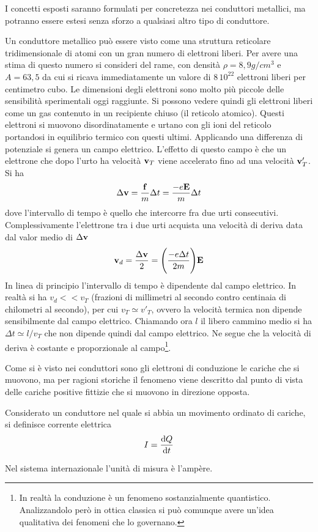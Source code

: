 I concetti esposti saranno formulati per concretezza nei conduttori metallici,
ma potranno essere estesi senza sforzo a qualsiasi altro tipo di conduttore.

Un conduttore metallico può essere visto come una struttura reticolare tridimensionale di atomi
con un gran numero di elettroni liberi. Per avere una stima di questo numero si consideri del rame,
con densità $\rho=8,9 g/cm^3$ e $A=63,5$ da cui si ricava immediatamente un valore di $8\,10^{22}$ elettroni liberi per centimetro cubo.
Le dimensioni degli elettroni sono molto più piccole delle sensibilità sperimentali oggi raggiunte.
Si possono vedere quindi gli elettroni liberi come un gas contenuto in un recipiente chiuso (il reticolo atomico).
Questi elettroni si muovono disordinatamente e urtano con gli ioni del reticolo portandosi
in equilibrio termico con questi ultimi. Applicando una differenza di potenziale si genera un campo elettrico.
L'effetto di questo campo è che un elettrone che dopo l'urto ha velocità $\vb{v}_T$ viene accelerato fino ad una velocità $\vb{v}'_T$.
Si ha
\[
\Delta\vb{v}=\frac{\vb{f}}{m}\Delta t=\frac{-e\vb{E}}{m}\Delta t
\]
dove l'intervallo di tempo è quello che intercorre fra due urti consecutivi. Complessivamente l'elettrone tra i due urti acquista una velocità di deriva
data dal valor medio di $\Delta\vb{v}$
\[
\vb{v}_d=\frac{\Delta\vb{v}}{2}=\Biggl(\frac{-e\Delta t}{2m} \Biggr)\vb{E}
\]
In linea di principio l'intervallo di tempo è dipendente dal campo elettrico.
In realtà si ha $v_d<<v_T$ (frazioni di millimetri al secondo contro centinaia di chilometri al secondo),
per cui $v_T\simeq v'_T$, ovvero la velocità termica non dipende sensibilmente dal campo elettrico.
Chiamando ora $l$ il libero cammino medio si ha $\Delta t\simeq l/v_T$ che non dipende quindi dal campo elettrico.
Ne segue che la velocità di deriva è costante e proporzionale al campo\footnote{In realtà la conduzione è un fenomeno sostanzialmente quantistico.
Analizzandolo però in ottica classica si può comunque avere un'idea qualitativa dei fenomeni che lo governano.}.

Come si è visto nei conduttori sono gli elettroni di conduzione le cariche che si muovono,
ma per ragioni storiche il fenomeno viene descritto dal punto di vista delle cariche positive fittizie che si muovono in direzione opposta.

\begin{defn} 
Considerato un conduttore nel quale si abbia un movimento ordinato di
cariche, si definisce corrente elettrica
\[
I=\dv{Q}{t}
\]
\end{defn}
Nel sistema internazionale l'unità di misura è l'ampère.
